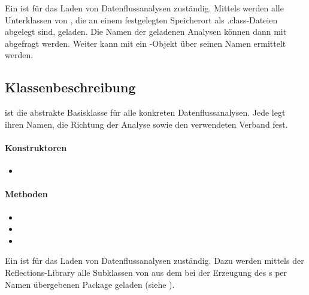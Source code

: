 Ein  ist für das Laden von Datenflussanalysen zuständig.
Mittels  werden alle Unterklassen von , die an einem festgelegten Speicherort als .class-Dateien abgelegt sind, geladen.
Die Namen der geladenen Analysen können dann mit  abgefragt werden.
Weiter kann mit  ein -Objekt über seinen Namen ermittelt werden.

\newpage

\subsection{Klassenbeschreibung}

 ist die abstrakte Basisklasse für alle konkreten Datenflussanalysen.
Jede  legt ihren Namen, die Richtung der Analyse sowie den verwendeten Verband fest.

\paragraph*{Konstruktoren} 
\begin{itemize}
	\item {}
\end{itemize}

\paragraph*{Methoden}
\begin{itemize}
	\item {}
	\item {}
	\item {}
\end{itemize}

Ein  ist für das Laden von Datenflussanalysen zuständig.
Dazu werden mittels der Reflections-Library alle Subklassen von  aus dem bei der Erzeugung des s per Namen übergebenen Package geladen (siehe ).

